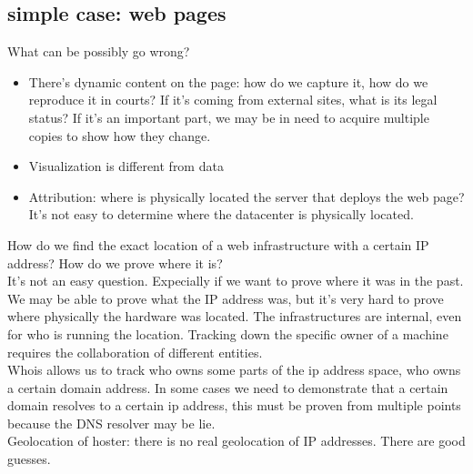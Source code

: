         \subsection{simple case: web pages}
            What can be possibly go wrong?
            \begin{itemize}
                \item There's dynamic content on the page: how do we capture it, how do we reproduce it in courts? If it's coming from external sites, what is its legal status? If it's an important part, we may be in need to acquire multiple copies to show how they change.
                \item Visualization is different from data 
                \item Attribution: where is physically located the server that deploys the web page? It's not easy to determine where the datacenter is physically located.
            \end{itemize} 
            How do we find the exact location of a web infrastructure with a certain IP address? How do we prove where it is?\\
            It's not an easy question. Expecially if we want to prove where it was in the past. We may be able to prove what the IP address was, but it's very hard to prove where physically the hardware was located.
            The infrastructures are internal, even for who is running the location. Tracking down the specific owner of a machine requires the collaboration of different entities.\\
            Whois allows us to track who owns some parts of the ip address space, who owns a certain domain address. In some cases we need to demonstrate that a certain domain resolves to a certain ip address, this must be proven from multiple points because the DNS resolver may be lie.\\
            Geolocation of hoster: there is no real geolocation of IP addresses. There are good guesses.

